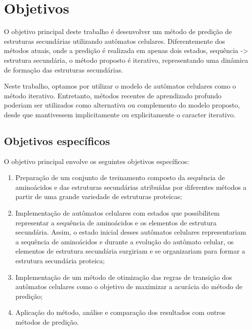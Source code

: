 \chapter{Objetivos}

O objetivo principal deste trabalho é desenvolver um método de predição de estruturas secundárias utilizando autômatos celulares. Diferentemente dos métodos atuais, onde a predição é realizada em apenas dois estados, sequência -> estrutura secundária, o método proposto é iterativo, representando uma dinâmica de formação das estruturas secundárias. 

Neste trabalho, optamos por utilizar o modelo de autômatos celulares como o método iterativo. Entretanto, métodos recentes de aprendizado profundo poderiam ser utilizados como alternativa ou complemento do modelo proposto, desde que mantivessem implicitamente ou explicitamente o caracter iterativo. 

\section{Objetivos específicos}

O objetivo principal envolve os seguintes objetivos específicos:

\begin{enumerate}
	\item Preparação de um conjunto de treinamento composto da sequência de aminoácidos e das estruturas secundárias atribuídas por diferentes métodos a partir de uma grande variedade de estruturas proteicas;
	\item Implementação de autômatos celulares com estados que possibilitem representar a sequência de aminoácidos e os elementos de estrutura secundária. Assim, o estado inicial desses autômatos celulares representariam a sequência de aminoácidos e durante a evolução do autômato celular, os elementos de estrutura secundária surgiriam e se organizariam para formar a estrutura secundária proteica;
	\item Implementação de um método de otimização das regras de transição dos autômatos celulares como o objetivo de maximizar a acurácia do método de predição;
	\item Aplicação do método, análise e comparação dos resultados com outros métodos de predição.
\end{enumerate}


